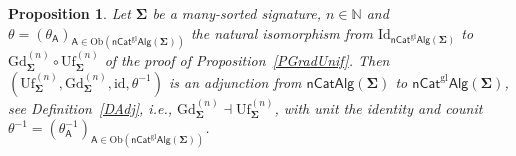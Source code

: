 \documentclass[a4paper, reqno
]{amsart}
\newcommand{\sig}[1]{\mathbf{#1}}             %
\newcommand{\calg}[1]{\boldsymbol{\mathsf{#1}}} %
\newcommand{\id}{\mathrm{id}}
\newcommand{\Id}{\mathrm{Id}}
\newcommand{\gl}{\mathrm{gl}}                %
\newcommand{\Gd}{\mathrm{Gd}}
\newcommand{\Uf}{\mathrm{Uf}}
\theoremstyle{plain}
\newtheorem{proposition}[theorem]{Proposition}
\theoremstyle{definition}
\begin{document}
\begin{proposition}\label{PGdUfAdj}
Let $\sig{\Sigma}$ be a many-sorted signature, $n\in\mathbb{N}$ and $\theta=(\theta_{\calg{A}})_{\calg{A}\in\mathrm{Ob}(\mathsf{nCat}^{\gl}\mathsf{Alg}(\sig{\Sigma}))}$ the natural isomorphism from $\Id_{\mathsf{nCat}^{\gl}\mathsf{Alg}(\sig{\Sigma})}$ to $\Gd^{(n)}_{\sig{\Sigma}}\circ\Uf^{(n)}_{\sig{\Sigma}}$ of the proof of Proposition~\ref{PGradUnif}.
Then $(\Uf^{(n)}_{\sig{\Sigma}},\Gd^{(n)}_{\sig{\Sigma}},\id,\theta^{-1})$ is an adjunction from $\mathsf{nCatAlg}(\sig{\Sigma})$ to $\mathsf{nCat}^{\gl}\mathsf{Alg}(\sig{\Sigma})$, see Definition~\ref{DAdj}, i.e., $\Gd^{(n)}_{\sig{\Sigma}}\dashv\Uf^{(n)}_{\sig{\Sigma}}$, with unit the identity and counit $\theta^{-1}=(\theta^{-1}_{\calg{A}})_{\calg{A}\in\mathrm{Ob}(\mathsf{nCat}^{\gl}\mathsf{Alg}(\sig{\Sigma}))}$.
\end{proposition}
\end{document}
